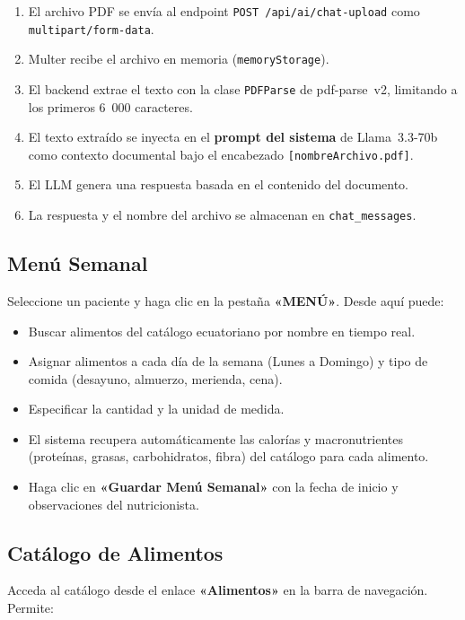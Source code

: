 \documentclass[12pt,a4paper]{article}
\begin{document}
\begin{enumerate}[leftmargin=2em]
  \item El archivo PDF se envía al endpoint \texttt{POST /api/ai/chat-upload} como
        \texttt{multipart/form-data}.
  \item Multer recibe el archivo en memoria (\texttt{memoryStorage}).
  \item El backend extrae el texto con la clase \texttt{PDFParse} de pdf-parse~v2,
        limitando a los primeros 6~000 caracteres.
  \item El texto extraído se inyecta en el \textbf{prompt del sistema} de Llama~3.3-70b
        como contexto documental bajo el encabezado \texttt{[nombreArchivo.pdf]}.
  \item El LLM genera una respuesta basada en el contenido del documento.
  \item La respuesta y el nombre del archivo se almacenan en \texttt{chat\_messages}.
\end{enumerate}

\subsection{Menú Semanal}

Seleccione un paciente y haga clic en la pestaña \textbf{«MENÚ»}. Desde aquí puede:

\begin{itemize}[leftmargin=1.5em]
  \item Buscar alimentos del catálogo ecuatoriano por nombre en tiempo real.
  \item Asignar alimentos a cada día de la semana (Lunes a Domingo) y tipo de
        comida (desayuno, almuerzo, merienda, cena).
  \item Especificar la cantidad y la unidad de medida.
  \item El sistema recupera automáticamente las calorías y macronutrientes (proteínas,
        grasas, carbohidratos, fibra) del catálogo para cada alimento.
  \item Haga clic en \textbf{«Guardar Menú Semanal»} con la fecha de inicio
        y observaciones del nutricionista.
\end{itemize}

\subsection{Catálogo de Alimentos}

Acceda al catálogo desde el enlace \textbf{«Alimentos»} en la barra de navegación.
Permite:
\end{document}
